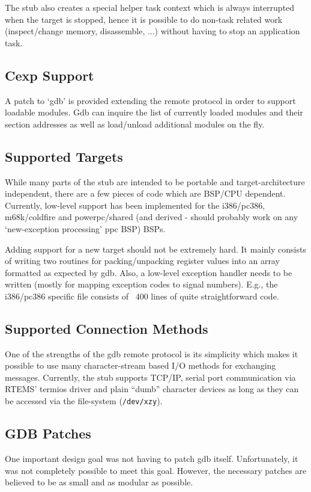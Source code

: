 \documentclass{article}
\begin{document}
The stub also creates a special helper task context which is
always interrupted when the target is stopped, hence it is
possible to do non-task related
work (inspect/change memory, disassemble, ...) without having
to stop an application task.

\subsection{Cexp Support}
A patch to `gdb' is provided extending the remote protocol
in order to support loadable modules. Gdb can inquire the
list of currently loaded modules and their section addresses
as well as load/unload additional modules on the fly.

\subsection{Supported Targets}
While many parts of the stub are intended to be portable
and target-architecture independent, there are a few pieces of code
which are BSP/CPU dependent. Currently, low-level support
has been implemented for the i386/pc386, m68k/coldfire and
powerpc/shared (and derived - should probably work on any
`new-exception processing' ppc BSP) BSPs.

Adding support for a new target should not be extremely
hard. It mainly consists of writing two routines for
packing/unpacking register values into an array formatted
as expected by gdb.
Also, a low-level exception handler needs to be
written (mostly for mapping exception codes to signal numbers).
E.g., the i386/pc386 specific file consists of ~400 lines
of quite straightforward code.

\subsection{Supported Connection Methods}
One of the strengths of the gdb remote protocol is its simplicity
which makes it possible to use many character-stream based
I/O methods for exchanging messages.
Currently, the stub supports TCP/IP, serial port communication
via RTEMS' termios driver and plain ``dumb'' character devices
as long as they can be accessed via the file-system ({\tt /dev/xzy}).

\subsection{GDB Patches}
One important design goal was not having to patch gdb itself.
Unfortunately, it was not completely possible to meet this
goal. However, the necessary patches are believed to be
as small and as modular as possible.
\end{document}
